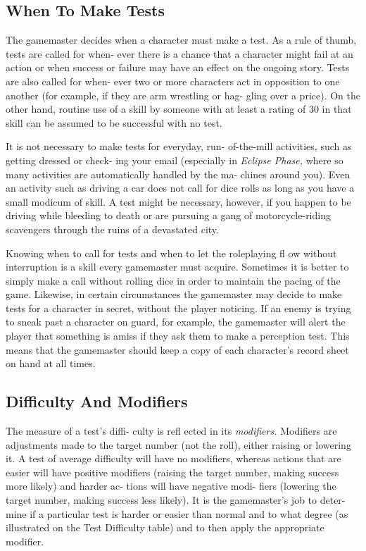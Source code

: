 \subsection{When To Make Tests}

The gamemaster decides when a character must make 
a test. As a rule of thumb, tests are called for when-
ever there is a chance that a character might fail at an 
action or when success or failure may have an effect 
on the ongoing story. Tests are also called for when-
ever two or more characters act in opposition to one 
another (for example, if they are arm wrestling or hag-
gling over a price). On the other hand, routine use of 
a skill by someone with at least a rating of 30 in that 
skill can be assumed to be successful with no test.

It is not necessary to make tests for everyday, run-
of-the-mill activities, such as getting dressed or check-
ing your email (especially in \textit{Eclipse Phase,} where so 
many activities are automatically handled by the ma-
chines around you). Even an activity such as driving 
a car does not call for dice rolls as long as you have 
a small modicum of skill. A test might be necessary, 
however, if you happen to be driving while bleeding 
to death or are pursuing a gang of motorcycle-riding 
scavengers through the ruins of a devastated city.

Knowing when to call for tests and when to let the 
roleplaying fl ow without interruption is a skill every 
gamemaster must acquire. Sometimes it is better to 
simply make a call without rolling dice in order to 
maintain the pacing of the game. Likewise, in certain 
circumstances the gamemaster may decide to make tests 
for a character in secret, without the player noticing. If 
an enemy is trying to sneak past a character on guard, 
for example, the gamemaster will alert the player that 
something is amiss if they ask them to make a perception 
test. This means that the gamemaster should keep a copy 
of each character's record sheet on hand at all times.

\subsection{Difficulty And Modifiers}

The measure of a test's diffi-
culty is refl ected in its \textit{modifiers.} 
Modifiers are adjustments made 
to the target number (not the 
roll), either raising or lowering 
it. A test of average difficulty 
will have no modifiers, whereas 
actions that are easier will have 
positive modifiers (raising the 
target number, making success 
more likely) and harder ac-
tions will have negative modi-
fiers (lowering the target number, 
making success less likely). It is 
the gamemaster's job to deter-
mine if a particular test is harder 
or easier than normal and to 
what degree (as illustrated on the 
Test Difficulty table) and to then 
apply the appropriate modifier.

